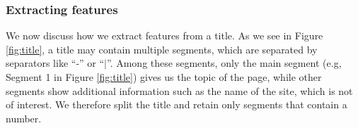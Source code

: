 


\subsubsection{Extracting features}
We now discuss how we extract features from a title.  As we see in
Figure \ref{fig:title}, a title may contain multiple segments, which
are separated by separators like ``-'' or ``$|$''.  Among these
segments, only the main segment (e.g, Segment 1 in Figure
\ref{fig:title}) gives us the topic of the page, while other
segments show additional information such as the name of the site,
which is not of interest. We therefore split the title and retain
only segments that contain a number.


